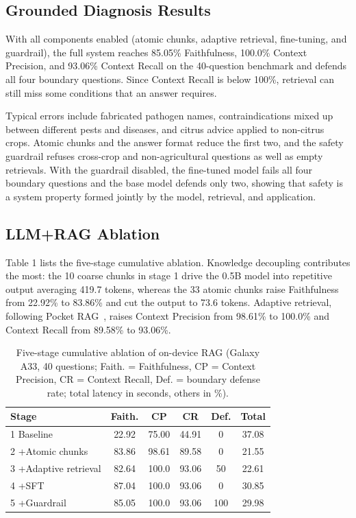 \documentclass[10pt,twocolumn,a4paper]{article}
\begin{document}
\subsection{Grounded Diagnosis Results}
With all components enabled (atomic chunks, adaptive retrieval, fine-tuning, and guardrail), the full system reaches 85.05\% Faithfulness, 100.0\% Context Precision, and 93.06\% Context Recall on the 40-question benchmark and defends all four boundary questions. Since Context Recall is below 100\%, retrieval can still miss some conditions that an answer requires.

Typical errors include fabricated pathogen names, contraindications mixed up between different pests and diseases, and citrus advice applied to non-citrus crops. Atomic chunks and the answer format reduce the first two, and the safety guardrail refuses cross-crop and non-agricultural questions as well as empty retrievals. With the guardrail disabled, the fine-tuned model fails all four boundary questions and the base model defends only two, showing that safety is a system property formed jointly by the model, retrieval, and application.

\subsection{LLM+RAG Ablation}
Table 1 lists the five-stage cumulative ablation. Knowledge decoupling contributes the most: the 10 coarse chunks in stage 1 drive the 0.5B model into repetitive output averaging 419.7 tokens, whereas the 33 atomic chunks raise Faithfulness from 22.92\% to 83.86\% and cut the output to 73.6 tokens. Adaptive retrieval, following Pocket RAG~\cite{kang2026}, raises Context Precision from 98.61\% to 100.0\% and Context Recall from 89.58\% to 93.06\%.

\begin{table}[t]
\centering
\caption{Five-stage cumulative ablation of on-device RAG (Galaxy A33, 40 questions; Faith. = Faithfulness, CP = Context Precision, CR = Context Recall, Def. = boundary defense rate; total latency in seconds, others in \%).}
\small
\begin{tabular}{@{}lccccc@{}}
\toprule
\textbf{Stage} & \textbf{Faith.} & \textbf{CP} & \textbf{CR} & \textbf{Def.} & \textbf{Total} \\
\midrule
1 Baseline & 22.92 & 75.00 & 44.91 & 0 & 37.08 \\
2 +Atomic chunks & 83.86 & 98.61 & 89.58 & 0 & 21.55 \\
3 +Adaptive retrieval & 82.64 & 100.0 & 93.06 & 50 & 22.61 \\
4 +SFT & 87.04 & 100.0 & 93.06 & 0 & 30.85 \\
5 +Guardrail & 85.05 & 100.0 & 93.06 & 100 & 29.98 \\
\bottomrule
\end{tabular}
\end{table}
\end{document}
